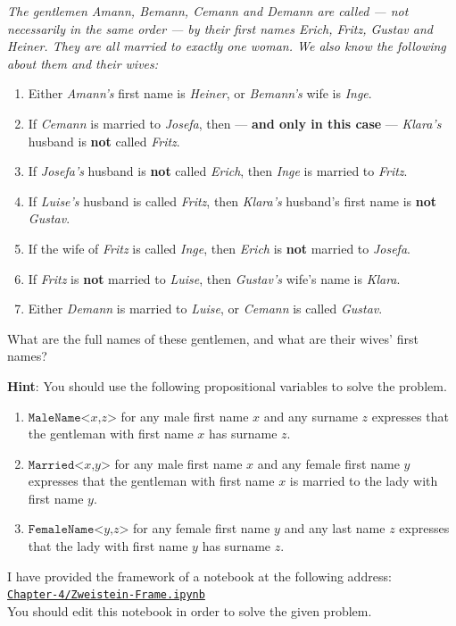 \begin{minipage}{0.95\linewidth}
  {\sl
    The gentlemen \emph{Amann}, \emph{Bemann}, \emph{Cemann} and \emph{Demann} are called --- not
    necessarily in the same order --- by their 
    first names \emph{Erich}, \emph{Fritz}, \emph{Gustav} and \emph{Heiner}. They are all married to
    exactly one woman. We also know the following about them and their wives: 
    \begin{enumerate}
    \item Either \emph{Amann's} first name is \emph{Heiner}, or \emph{Bemann's} wife is \emph{Inge}.
    \item If \emph{Cemann} is married to \emph{Josefa}, then --- \textbf{and only in this case} ---
          \emph{Klara's} husband is \textbf{not} called \emph{Fritz}.
    \item If \emph{Josefa's} husband is \textbf{not} called \emph{Erich}, then \emph{Inge} is married to
          \emph{Fritz}. 
    \item If \emph{Luise's} husband is called \emph{Fritz}, then \emph{Klara's} husband's first name is
          \textbf{not} \emph{Gustav}. 
    \item If the wife of \emph{Fritz} is called \emph{Inge}, then \emph{Erich} is \textbf{not} married to
          \emph{Josefa}. 
    \item If \emph{Fritz} is \textbf{not} married to \emph{Luise}, then \emph{Gustav's} wife's name is \emph{Klara}.
    \item Either \emph{Demann} is married to \emph{Luise}, or \emph{Cemann} is called \emph{Gustav}.
    \end{enumerate}
    What are the full names of these gentlemen, and what are their wives' first names?}
\end{minipage}
\vspace*{0.3cm}

\noindent
\textbf{Hint}: You should use the following propositional variables to solve the problem.
\begin{enumerate}
\item $\texttt{MaleName<}x\texttt{,}z\texttt{>}$ for any male first name $x$ and any surname $z$ expresses
  that the gentleman with first name $x$ has surname $z$.
\item $\texttt{Married<}x\texttt{,}y\texttt{>}$ for any male first name $x$ and any female first name $y$ expresses
  that the gentleman with first name $x$ is married to the lady with first name $y$.
\item $\texttt{FemaleName<}y\texttt{,}z\texttt{>}$ for any female first name $y$ and any last name $z$ expresses
  that the lady with first name $y$ has surname $z$. \eox
\end{enumerate}
I have provided the framework of a notebook at the following address:
\\[0.2cm]
\hspace*{1.3cm}
\href{https://github.com/karlstroetmann/Logic/blob/master/Java/Chapter-4/Zweistein-Frame.ipynb}{\texttt{Chapter-4/Zweistein-Frame.ipynb}}
\\[0.2cm]
You should edit this notebook in order to solve the given problem. \eox



